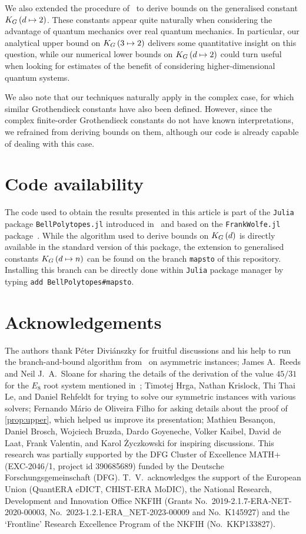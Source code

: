 \documentclass[10pt,aps,notitlepage,onecolumn,pra,superscriptaddress]{revtex4-1}
\newcommand\KG[2]{K_G\left({#1}\ifx#2\empty\else\mapsto\fi{#2}\right)}
\begin{document}
We also extended the procedure of~\cite{DIB+23} to derive bounds on the generalised constant $\KG{d}{2}$.
These constants appear quite naturally when considering the advantage of quantum mechanics over real quantum mechanics.
In particular, our analytical upper bound on $\KG{3}{2}$ delivers some quantitative insight on this question, while our numerical lower bounds on $\KG{d}{2}$ could turn useful when looking for estimates of the benefit of considering higher-dimensional quantum systems.

We also note that our techniques naturally apply in the complex case, for which similar Grothendieck constants have also been defined.
However, since the complex finite-order Grothendieck constants do not have known interpretations, we refrained from deriving bounds on them, although our code is already capable of dealing with this case.

\section{Code availability}

The code used to obtain the results presented in this article is part of the \texttt{Julia} package \texttt{BellPolytopes.jl} introduced in~\cite{DIB+23} and based on the \texttt{FrankWolfe.jl} package~\cite{BCP22,BDH+24}.
While the algorithm used to derive bounds on $\KG{d}{}$ is directly available in the standard version of this package, the extension to generalised constants $\KG{d}{n}$ can be found on the branch \texttt{mapsto} of this repository.
Installing this branch can be directly done within \texttt{Julia} package manager by typing \texttt{add BellPolytopes\#mapsto}.

\section{Acknowledgements}
\label{sec:acks}

The authors thank
Péter Diviánszky for fruitful discussions and his help to run the branch-and-bound algorithm from~\cite{DBV17} on asymmetric instances;
James A.~Reeds and Neil J.~A.~Sloane for sharing the details of the derivation of the value $45/31$ for the $E_8$ root system mentioned in~\cite{FR94};
Timotej Hrga, Nathan Krislock, Thi Thai Le, and Daniel Rehfeldt for trying to solve our symmetric instances with various solvers;
Fernando Mário de Oliveira Filho for asking details about the proof of \cref{prop:upper}, which helped us improve its presentation;
Mathieu Besançon, Daniel Brosch, Wojciech Bruzda, Dardo Goyeneche, Volker Kaibel, David de Laat, Frank Valentin, and Karol Życzkowski for inspiring discussions.
This research was partially supported by the DFG Cluster of Excellence MATH+ (EXC-2046/1, project id 390685689) funded by the Deutsche Forschungsgemeinschaft (DFG).
T.~V.~acknowledges the support of the European Union (QuantERA eDICT, CHIST-ERA MoDIC), the National Research, Development and Innovation Office NKFIH (Grants No.~2019-2.1.7-ERA-NET-2020-00003, No.~2023-1.2.1-ERA\_NET-2023-00009 and No.~K145927) and the `Frontline' Research Excellence Program of the NKFIH (No.~KKP133827). 


\end{document}
